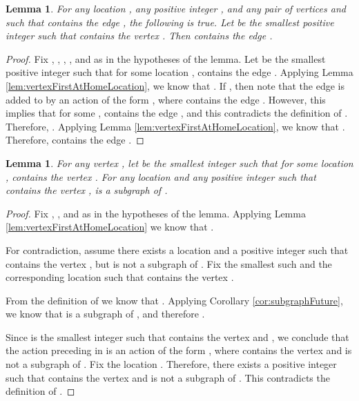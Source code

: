 \documentclass[11pt]{article}
\numberwithin{theorem}{section}
\newtheorem{lemma}[theorem]{Lemma}
\begin{document}
 
 




\begin{lemma}\label{lem:edgeFirstAtHomeLocation}
For any location , any positive integer , and any pair of
vertices  and  such that  contains
the edge , the following is true. Let  be the smallest
positive integer such that  contains the vertex
. 
Then  contains the edge .
\end{lemma}



\begin{proof}
Fix , , , , and  as in the hypotheses of the
lemma. Let  be the smallest positive integer such that for
some location ,  contains the edge
. Applying Lemma \ref{lem:vertexFirstAtHomeLocation}, 
we know that . If , then note that the edge
 is added to  by an action of the form
, where  contains the edge
. However, this implies that for some ,
 contains the edge , and this
contradicts the definition of . Therefore, . Applying Lemma \ref{lem:vertexFirstAtHomeLocation}, 
we know that
. Therefore,  contains the edge .
\end{proof}


\begin{lemma}\label{lem:containsVertexContainsSubgraph}
For any vertex , let  be the smallest integer such that
for some location ,  contains the vertex
. For any location  and any positive integer  such
that  contains the vertex ,
 is a subgraph of .
\end{lemma}

\begin{proof}
Fix , , and  as in the hypotheses of the lemma. Applying Lemma \ref{lem:vertexFirstAtHomeLocation} we know that .


For contradiction, assume there exists a location  and a positive integer  such that  contains the vertex , but  is not a subgraph of . Fix the smallest such  and the corresponding location  such that  contains the vertex . 

From the definition of  we know that . Applying Corollary \ref{cor:subgraphFuture}, we know that  is a subgraph of , and therefore  . 

Since  is the smallest integer such that  contains the vertex  and , we conclude that the action preceding  in  is an action of the form , where  contains the vertex  and  is not a subgraph of . Fix the location . Therefore, there exists a positive integer  such that  contains the vertex  and  is not a subgraph of . This contradicts the definition of .
\end{proof}
\end{document}
